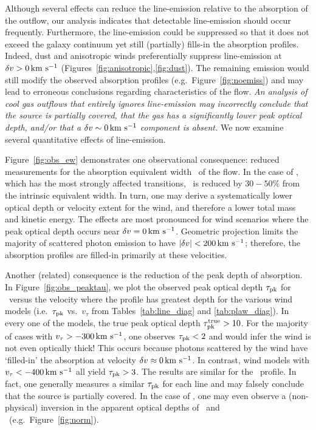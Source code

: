 \documentclass[12pt,preprint]{aastex}
\begin{document}
Although several effects can reduce the line-emission
relative to the absorption of the outflow, our analysis
indicates that detectable line-emission should occur frequently. 
Furthermore, the line-emission could be suppressed so %
that it does not
exceed
the galaxy continuum yet still (partially) fills-in the absorption
profiles. Indeed, dust and anisotropic winds preferentially suppress
line-emission at $\delta v > 0 \, {\rm km~s^{-1}}$
(Figures~\ref{fig:anisotropic},\ref{fig:dust}).
The remaining emission would still 
modify the observed absorption profiles (e.g.\
Figure~\ref{fig:noemiss}) and may lead to erroneous conclusions
regarding characteristics of the flow.  {\it An analysis of cool gas outflows
that entirely ignores line-emission may incorrectly conclude that the source is
partially covered, that the gas has a significantly lower peak optical depth,
and/or that a $\delta v \sim 0 \, {\rm km~s^{-1}}$ component is
absent.}  
We now examine several quantitative effects of line-emission.

Figure~\ref{fig:obs_ew} demonstrates one observational
consequence: reduced measurements for the absorption
equivalent width \ewabs\ of the flow.  In the case of ,
which has the most strongly affected transitions, \ewabs\ is reduced by
$30-50\%$ from the intrinsic equivalent width.  In turn, one may derive 
a systematically lower optical depth or velocity extent for the wind,
and therefore a lower total mass and kinetic energy.  
The effects are most pronounced for wind
scenarios where the peak optical depth occurs near $\delta v = 0 \, {\rm km~s^{-1}}$.
Geometric projection limits the majority of scattered photon emission to
have $|\delta v| < 200 \, {\rm km~s^{-1}}$; therefore,  the absorption profiles
are filled-in primarily at these velocities.  

Another (related) consequence is the reduction of the peak depth of 
absorption.
In Figure~\ref{fig:obs_peaktau}, we plot the observed peak optical depth
$\tau_{\rm pk}$ for \mgiia\ 
versus the velocity where the profile has greatest depth 
for the various wind models (i.e.\
$\tau_{\rm pk}$ vs.\ $v_\tau$ from Tables~\ref{tab:line_diag} and
\ref{tab:plaw_diag}).   In every one of the models, the true peak
optical depth $\tau_{\rm pk}^{\rm true} > 10$.  For the
majority of cases with $v_\tau > -300\, {\rm km~s^{-1}}$, one observes $\tau_{\rm pk} <
2$ and would infer the wind is not even optically thick!
This occurs because photons scattered by the wind have `filled-in' the
absorption at velocity $\delta v \approx 0 \, {\rm km~s^{-1}}$.  In contrast, wind
models with $v_\tau < -400 \, {\rm km~s^{-1}}$ all yield $\tau_{\rm pk} > 3$.  The
results are similar for the \mgiib\ profile.  In fact, one generally
measures a similar $\tau_{\rm pk}$ for each \ion{Mg}{2} line and %
may 
falsely conclude that the source is partially covered. 
In the case of \ion{Fe}{2}, one may even observe a (non-physical)
inversion in the apparent optical depths of \feiia\ and \feiib\ (e.g.\
Figure~\ref{fig:norm}). 
\end{document}
